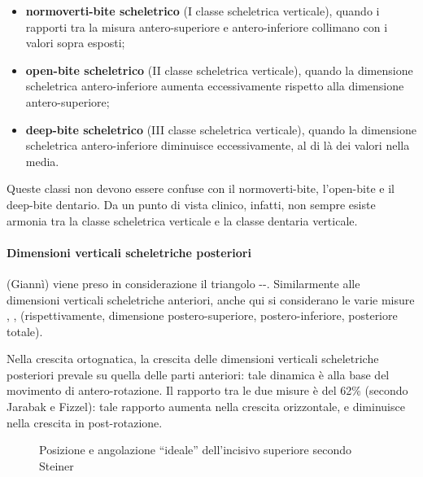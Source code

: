 \begin{itemize}
\item \textbf{normoverti-bite scheletrico} (I classe scheletrica verticale), quando i rapporti tra la misura antero-superiore e antero-inferiore collimano con i valori sopra esposti;
\item \textbf{open-bite scheletrico} (II classe scheletrica verticale), quando la dimensione scheletrica antero-inferiore aumenta eccessivamente rispetto alla dimensione antero-superiore;
\item \textbf{deep-bite scheletrico} (III classe scheletrica verticale), quando la dimensione scheletrica antero-inferiore diminuisce eccessivamente, al di là dei valori nella media.
\end{itemize}

Queste classi non devono essere confuse con il normoverti-bite, l'open-bite e il deep-bite dentario. Da un punto di vista clinico, infatti, non sempre esiste armonia tra la classe scheletrica verticale e la classe dentaria verticale.

\paragraph{Dimensioni verticali scheletriche posteriori} (Giannì) viene preso in considerazione il triangolo --. Similarmente alle dimensioni verticali scheletriche anteriori, anche qui si considerano le varie misure , ,  (rispettivamente, dimensione postero-superiore, postero-inferiore, posteriore totale).

Nella crescita ortognatica, la crescita delle dimensioni verticali scheletriche posteriori prevale su quella delle parti anteriori: tale dinamica è alla base del movimento di antero-rotazione. Il rapporto tra le due misure è del 62\% (secondo Jarabak e Fizzel): tale rapporto aumenta nella crescita orizzontale, e diminuisce nella crescita in post-rotazione.

\begin{figure}
 \centering
 \caption{Posizione e angolazione ``ideale'' dell'incisivo superiore secondo Steiner}
 \label{fig:steiner_incisivo_superiore}
\end{figure}


